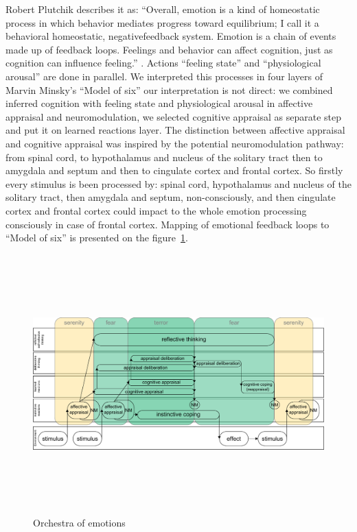 Robert Plutchik describes it as: ``Overall, emotion is a kind of homeostatic process in which behavior mediates progress toward equilibrium; I call it a behavioral homeostatic, negativefeedback system. Emotion is a chain of events made up of feedback loops. Feelings and behavior can affect cognition, just as cognition can influence feeling.'' \cite{natureofemotions}. Actions ``feeling state'' and ``physiological arousal'' are done in parallel. We interpreted this processes in four layers of Marvin Minsky's ``Model of six'' our interpretation is not direct: we combined inferred cognition with feeling state and physiological arousal in affective appraisal and neuromodulation, we selected cognitive appraisal as separate step and put it on learned reactions layer. The distinction between affective appraisal and cognitive appraisal was inspired by \cite{emotionsbraintorobot, neuromodulatory} the potential neuromodulation pathway: from spinal cord, to hypothalamus and nucleus of the solitary tract then to amygdala and septum and then to cingulate cortex and frontal cortex. So firstly every stimulus is been processed by: spinal cord, hypothalamus and nucleus of the solitary tract, then amygdala and septum, non-consciously, and then cingulate cortex and frontal cortex could impact to the whole emotion processing consciously in case of frontal cortex. Mapping of emotional feedback loops to ``Model of six'' is presented on the figure~\ref{orchestra_of_emotions}.

\begin{figure}
\begin{center}
 \includegraphics[height=10cm, angle=90]{figure2_orchestra_of_emotions}
\end{center}
\caption{Orchestra of emotions \label{orchestra_of_emotions}}
\end{figure}

